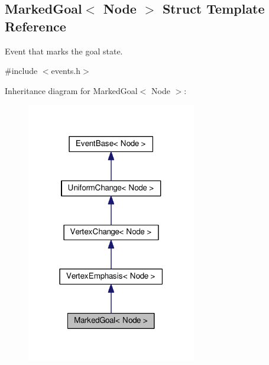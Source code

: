 \hypertarget{structMarkedGoal}{}\subsection{Marked\+Goal$<$ Node $>$ Struct Template Reference}
\label{structMarkedGoal}


Event that marks the goal state.  




{\ttfamily \#include $<$events.\+h$>$}



Inheritance diagram for Marked\+Goal$<$ Node $>$\+:\nopagebreak
\begin{figure}[H]
\begin{center}
\leavevmode
\includegraphics[width=210pt]{structMarkedGoal__inherit__graph}
\end{center}
\end{figure}



